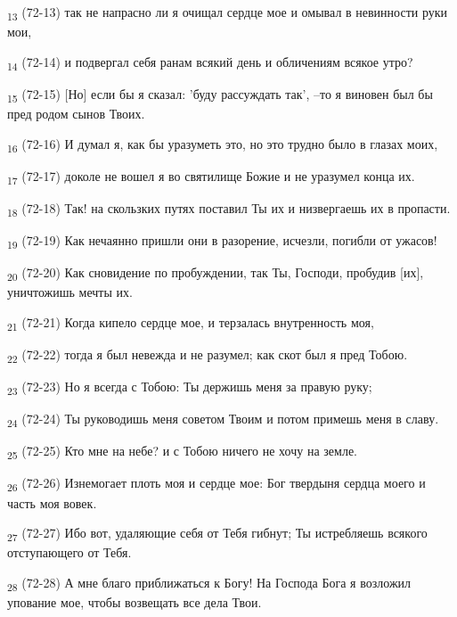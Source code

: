\begin{tcolorbox}
\textsubscript{13} (72-13) так не напрасно ли я очищал сердце мое и омывал в невинности руки мои,
\end{tcolorbox}
\begin{tcolorbox}
\textsubscript{14} (72-14) и подвергал себя ранам всякий день и обличениям всякое утро?
\end{tcolorbox}
\begin{tcolorbox}
\textsubscript{15} (72-15) [Но] если бы я сказал: 'буду рассуждать так', --то я виновен был бы пред родом сынов Твоих.
\end{tcolorbox}
\begin{tcolorbox}
\textsubscript{16} (72-16) И думал я, как бы уразуметь это, но это трудно было в глазах моих,
\end{tcolorbox}
\begin{tcolorbox}
\textsubscript{17} (72-17) доколе не вошел я во святилище Божие и не уразумел конца их.
\end{tcolorbox}
\begin{tcolorbox}
\textsubscript{18} (72-18) Так! на скользких путях поставил Ты их и низвергаешь их в пропасти.
\end{tcolorbox}
\begin{tcolorbox}
\textsubscript{19} (72-19) Как нечаянно пришли они в разорение, исчезли, погибли от ужасов!
\end{tcolorbox}
\begin{tcolorbox}
\textsubscript{20} (72-20) Как сновидение по пробуждении, так Ты, Господи, пробудив [их], уничтожишь мечты их.
\end{tcolorbox}
\begin{tcolorbox}
\textsubscript{21} (72-21) Когда кипело сердце мое, и терзалась внутренность моя,
\end{tcolorbox}
\begin{tcolorbox}
\textsubscript{22} (72-22) тогда я был невежда и не разумел; как скот был я пред Тобою.
\end{tcolorbox}
\begin{tcolorbox}
\textsubscript{23} (72-23) Но я всегда с Тобою: Ты держишь меня за правую руку;
\end{tcolorbox}
\begin{tcolorbox}
\textsubscript{24} (72-24) Ты руководишь меня советом Твоим и потом примешь меня в славу.
\end{tcolorbox}
\begin{tcolorbox}
\textsubscript{25} (72-25) Кто мне на небе? и с Тобою ничего не хочу на земле.
\end{tcolorbox}
\begin{tcolorbox}
\textsubscript{26} (72-26) Изнемогает плоть моя и сердце мое: Бог твердыня сердца моего и часть моя вовек.
\end{tcolorbox}
\begin{tcolorbox}
\textsubscript{27} (72-27) Ибо вот, удаляющие себя от Тебя гибнут; Ты истребляешь всякого отступающего от Тебя.
\end{tcolorbox}
\begin{tcolorbox}
\textsubscript{28} (72-28) А мне благо приближаться к Богу! На Господа Бога я возложил упование мое, чтобы возвещать все дела Твои.
\end{tcolorbox}
